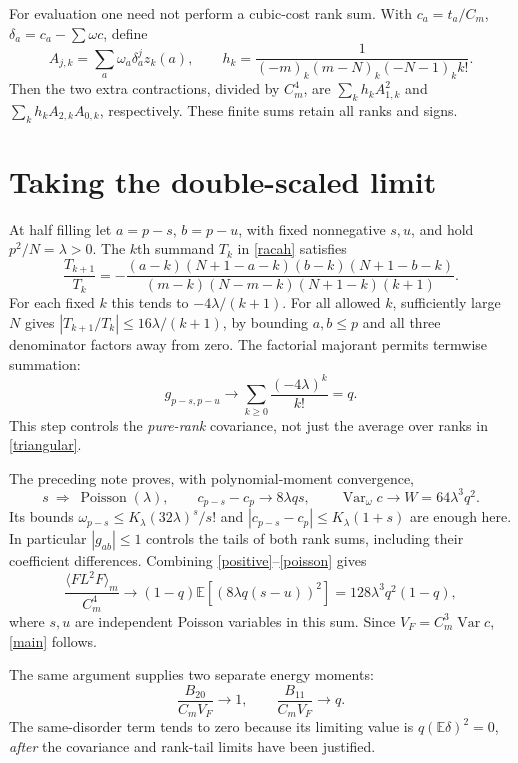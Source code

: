 \documentclass[11pt,a4paper]{article}
\newcommand{\E}{\mathbb E}
\newcommand{\av}[1]{\langle #1\rangle}
\begin{document}
For evaluation one need not perform a cubic-cost rank sum.
With $c_a=t_a/C_m$, $\delta_a=c_a-\sum\omega c$, define
\[
 A_{j,k}=\sum_a\omega_a\delta_a^j z_k(a),\qquad
 h_k=\frac1{(-m)_k(m-N)_k(-N-1)_k k!}.
\]
Then the two extra contractions, divided by $C_m^4$, are
$\sum_k h_k A_{1,k}^2$ and $\sum_k h_k A_{2,k}A_{0,k}$,
respectively. These finite sums retain all ranks and signs.

\newpage
\section{Taking the double-scaled limit}
At half filling let $a=p-s$, $b=p-u$, with fixed nonnegative
$s,u$, and hold $p^2/N=\lambda>0$. The $k$th summand $T_k$
in \eqref{racah} satisfies
\[
 \frac{T_{k+1}}{T_k}=
 -\frac{(a-k)(N+1-a-k)(b-k)(N+1-b-k)}
 {(m-k)(N-m-k)(N+1-k)(k+1)}.
\]
For each fixed $k$ this tends to $-4\lambda/(k+1)$.
For all allowed $k$, sufficiently large $N$ gives
$|T_{k+1}/T_k|\leq16\lambda/(k+1)$, by bounding $a,b\leq p$
and all three denominator factors away from zero.
The factorial majorant permits termwise summation:
\begin{equation}
 g_{p-s,p-u}\longrightarrow
 \sum_{k\geq0}\frac{(-4\lambda)^k}{k!}=q.       \label{glimit}
\end{equation}
This step controls the \emph{pure-rank} covariance, not just the
average over ranks in \eqref{triangular}.

The preceding note proves, with polynomial-moment convergence,
\begin{equation}
 s\ \Longrightarrow\ \operatorname{Poisson}(\lambda),\qquad
 c_{p-s}-c_p\longrightarrow 8\lambda q s,
 \qquad \operatorname{Var}_{\omega}c\longrightarrow
 W=64\lambda^3q^2.                            \label{poisson}
\end{equation}
Its bounds $\omega_{p-s}\leq K_\lambda(32\lambda)^s/s!$
and $|c_{p-s}-c_p|\leq K_\lambda(1+s)$ are enough here.
In particular $|g_{ab}|\leq1$ controls the tails of both rank
sums, including their coefficient differences. Combining
\eqref{positive}--\eqref{poisson} gives
\begin{equation}
 \frac{\av{FL^2F}_m}{C_m^4}\longrightarrow
 (1-q)\E\!\left[(8\lambda q(s-u))^2\right]
 =128\lambda^3q^2(1-q),                       \label{momentlimit}
\end{equation}
where $s,u$ are independent Poisson variables in this sum.
Since $V_F=C_m^3\operatorname{Var}c$, \eqref{main} follows.

The same argument supplies two separate energy moments:
\begin{equation}
 \frac{B_{20}}{C_mV_F}\to1,\qquad
 \frac{B_{11}}{C_mV_F}\to q.                  \label{bilimits}
\end{equation}
The same-disorder term tends to zero because its limiting
value is $q(\E\delta)^2=0$, \emph{after} the covariance and
rank-tail limits have been justified.
\end{document}
